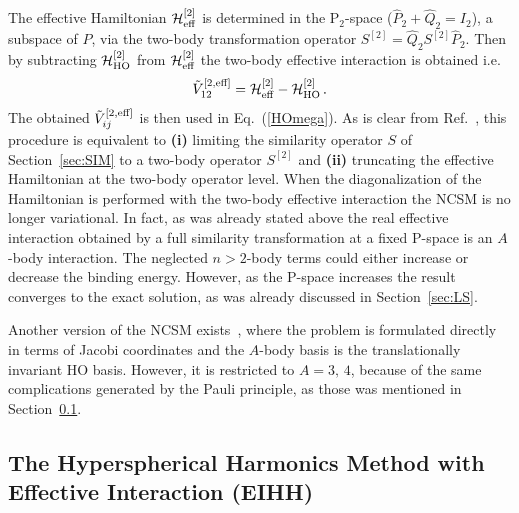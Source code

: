  

The effective Hamiltonian ${\cal H}^{[2]}_{\rm eff}$ is determined in  
the P$_{2}$-space ($\hat P_2+ \hat Q_2 =I_2$), a subspace of $P$, via 
the two-body transformation operator $S^{[2]}=\hat Q_2 S^{[2]}  \hat P_2$. 
Then by subtracting ${\cal H}^{[2]}_{\rm HO}$ from ${\cal H}^{[2]}_{\rm eff}$ the two-body effective interaction is obtained  i.e. 
\begin{equation}
\tilde V_{12}^{[2,\rm eff]}  = {\cal H}^{[2]}_{\rm eff} - {\cal H}^{[2]}_{\rm HO}\,.
\end{equation}
The obtained  $\tilde V_{ij}^{[2,\rm eff]}$  is then used in Eq.~(\ref{HOmega}).
As is clear from Ref.~\cite{DaS64}, this procedure 
is equivalent to  {\bf (i)} limiting the similarity operator $S$ of Section~\ref{sec:SIM}   to
a  two-body operator $S^{[2]}$ and {\bf (ii)} truncating the effective Hamiltonian   at the two-body operator level. 
When the diagonalization of the Hamiltonian is performed with the two-body effective interaction the  NCSM is no longer  variational. 
In fact, as was already stated above the real effective interaction obtained by a full similarity transformation at a fixed P-space
is an $A$-body interaction. The neglected $n>2$-body terms  could either increase
or decrease the binding energy. However, as the P-space increases
the result converges to the exact solution, as was already discussed in Section~\ref{sec:LS}. 

Another version of the NCSM exists~\cite{NAV:1998}, where the problem is  formulated directly in terms of Jacobi coordinates 
and the $A$-body basis is 
the translationally invariant HO basis.  However, it is  restricted to $A=3,\,4$, 
because of the same complications generated by the Pauli principle, as those was mentioned in Section~\ref{sec:EIHH}.


\subsection{The Hyperspherical Harmonics Method with Effective Interaction (EIHH)}\label{sec:EIHH}

